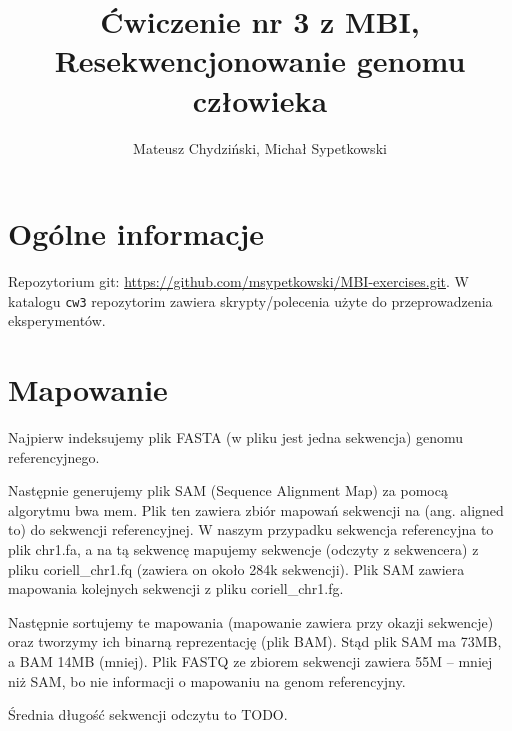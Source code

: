 \documentclass[a4paper]{article}
\begin{document}
\title{Ćwiczenie nr 3 z MBI, Resekwencjonowanie genomu człowieka}
\author{Mateusz Chydziński, Michał Sypetkowski}
\maketitle

\section{Ogólne informacje}
Repozytorium git: \url{https://github.com/msypetkowski/MBI-exercises.git}.
W katalogu \texttt{cw3} repozytorim zawiera skrypty/polecenia użyte do przeprowadzenia eksperymentów.

\section{Mapowanie}

Najpierw indeksujemy plik FASTA (w pliku jest jedna sekwencja) genomu referencyjnego.

Następnie generujemy plik SAM (Sequence Alignment Map) za pomocą algorytmu bwa mem.
Plik ten zawiera zbiór mapowań sekwencji na (ang. aligned to) do sekwencji referencyjnej.
W naszym przypadku sekwencja referencyjna to plik chr1.fa,
a na tą sekwencę mapujemy sekwencje (odczyty z sekwencera)
z pliku coriell_chr1.fq (zawiera on około 284k sekwencji).
Plik SAM zawiera mapowania kolejnych sekwencji z pliku coriell_chr1.fg.

Następnie sortujemy te mapowania (mapowanie zawiera przy okazji sekwencje)
oraz tworzymy ich binarną reprezentację (plik BAM).
Stąd plik SAM ma 73MB, a BAM 14MB (mniej).
Plik FASTQ ze zbiorem sekwencji zawiera 55M --
mniej niż SAM, bo nie informacji o mapowaniu na genom referencyjny.

Średnia długość sekwencji odczytu to TODO.
\end{document}
